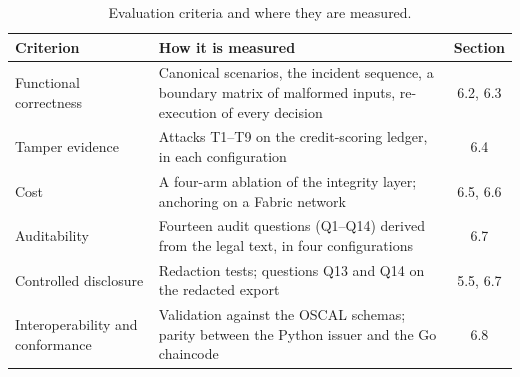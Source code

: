 \begin{table}[t]
\caption{Evaluation criteria and where they are measured.}
\label{tab:criteria}
\footnotesize
\begin{tabularx}{\columnwidth}{@{}>{\raggedright\arraybackslash}p{}Lc@{}}
\toprule
Criterion & How it is measured & Section \\
\midrule
Functional correctness & Canonical scenarios, the incident sequence, a boundary matrix of malformed inputs, re-execution of every decision & 6.2, 6.3 \\
Tamper evidence & Attacks T1--T9 on the credit-scoring ledger, in each configuration & 6.4 \\
Cost & A four-arm ablation of the integrity layer; anchoring on a Fabric network & 6.5, 6.6 \\
Auditability & Fourteen audit questions (Q1--Q14) derived from the legal text, in four configurations & 6.7 \\
Controlled disclosure & Redaction tests; questions Q13 and Q14 on the redacted export & 5.5, 6.7 \\
Interoperability and conformance & Validation against the OSCAL schemas; parity between the Python issuer and the Go chaincode & 6.8 \\
\bottomrule
\end{tabularx}
\end{table}
